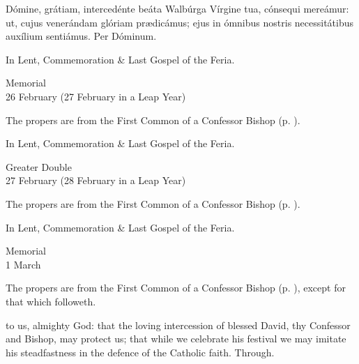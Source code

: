\postcommunion
{} Dómine, grátiam, intercedénte beáta Walbúrga Vírgine tua, cónsequi mereámur: ut, cujus venerándam glóriam pr{\ae}dicámus; ejus in ómnibus nostris necessitátibus auxílium sentiámus. Per Dóminum.

\begin{rubric}
	In Lent, Commemoration \& Last Gospel of the Feria.
\end{rubric}


\begin{inhead}
    {Memorial\\
26 February (27 February in a Leap Year)}
\end{inhead}

\begin{rubric}
	The propers are from the First Common of a Confessor Bishop (p. \pageref{CommonConfessorBishopI}).
\end{rubric}
\begin{rubric}
	In Lent, Commemoration \& Last Gospel of the Feria.
\end{rubric}


\begin{inhead}
    {Greater Double\\
27 February (28 February in a Leap Year)}
\end{inhead}

\begin{rubric}
	The propers are from the First Common of a Confessor Bishop (p. \pageref{CommonConfessorBishopI}).
\end{rubric}
\begin{rubric}
	In Lent, Commemoration \& Last Gospel of the Feria.
\end{rubric}


\begin{inhead}
    {Memorial\\
1 March}
\end{inhead}

\begin{rubric}
	The propers are from the First Common of a Confessor Bishop (p. \pageref{CommonConfessorBishopI}), except for that which followeth.
\end{rubric}

\collect
{} to us, almighty God: that the loving intercession of blessed David, thy Confessor and Bishop, may protect us; that while we celebrate his festival we may imitate his steadfastness in the defence of the Catholic faith. Through.

